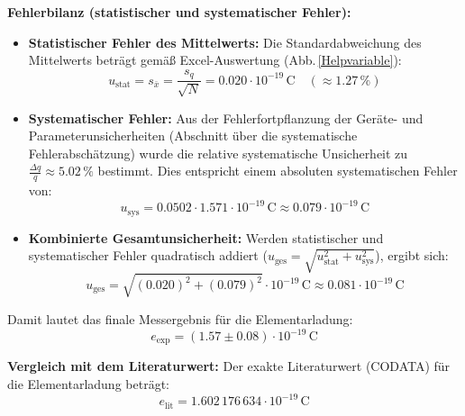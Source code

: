 \documentclass[12pt,a4paper,titlepage]{scrartcl}
\numberwithin{equation}{section}
\numberwithin{table}{section}
\numberwithin{figure}{section}
\begin{document}
\medskip
\noindent
\textbf{Fehlerbilanz (statistischer und systematischer Fehler):}
\begin{itemize}
    \item \textbf{Statistischer Fehler des Mittelwerts:} 
    Die Standardabweichung des Mittelwerts beträgt gemäß Excel-Auswertung (Abb.\,\ref{Helpvariable}):
    \begin{equation}
        u_{\text{stat}} = s_{\bar{x}} = \frac{s_q}{\sqrt{N}} = 0.020 \cdot 10^{-19}\,\text{C} \quad (\approx 1.27\,\%)
    \end{equation}
    \item \textbf{Systematischer Fehler:} 
    Aus der Fehlerfortpflanzung der Geräte- und Parameterunsicherheiten (Abschnitt über die systematische Fehlerabschätzung) wurde die relative systematische Unsicherheit zu $\frac{\Delta q}{q} \approx 5.02\,\%$ bestimmt. Dies entspricht einem absoluten systematischen Fehler von:
    \begin{equation}
        u_{\text{sys}} = 0.0502 \cdot 1.571 \cdot 10^{-19}\,\text{C} \approx 0.079 \cdot 10^{-19}\,\text{C}
    \end{equation}
    \item \textbf{Kombinierte Gesamtunsicherheit:} 
    Werden statistischer und systematischer Fehler quadratisch addiert ($u_{\text{ges}} = \sqrt{u_{\text{stat}}^2 + u_{\text{sys}}^2}$), ergibt sich:
    \begin{equation}
        u_{\text{ges}} = \sqrt{(0.020)^2 + (0.079)^2} \cdot 10^{-19}\,\text{C} \approx 0.081 \cdot 10^{-19}\,\text{C}
    \end{equation}
\end{itemize}

\medskip
\noindent
Damit lautet das finale Messergebnis für die Elementarladung:
\begin{equation}
    e_{\text{exp}} = (1.57 \pm 0.08) \cdot 10^{-19}\,\text{C}
\end{equation}

\medskip
\noindent
\textbf{Vergleich mit dem Literaturwert:}
Der exakte Literaturwert (CODATA) für die Elementarladung beträgt:
\begin{equation}
    e_{\text{lit}} = 1.602\,176\,634 \cdot 10^{-19}\,\text{C}
\end{equation}
\end{document}
